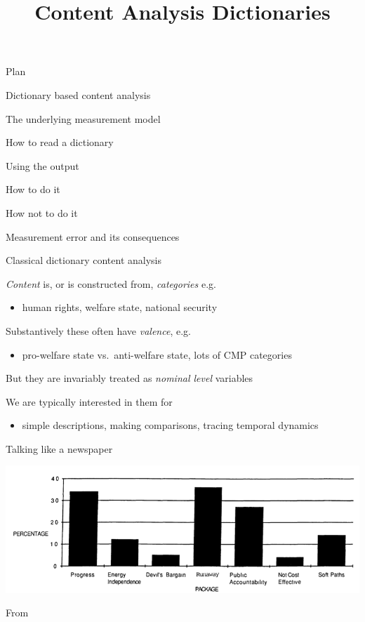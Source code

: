 \documentclass{hertieteaching}
\title{Content Analysis Dictionaries}
\begin{document}
\maketitle


\begin{frame}{Plan}
	

Dictionary based content analysis

The underlying measurement model

How to read a dictionary

Using the output

How to do it

How not to do it

Measurement error and its consequences
	
\end{frame}



\begin{frame}{Classical dictionary content analysis}

\emph{Content} is, or is constructed from, \emph{categories} e.g.

\begin{itemize}
\item
  human rights, welfare state, national security
\end{itemize}

Substantively these often have \emph{valence}, e.g.

\begin{itemize}
\item
  pro-welfare state vs.~anti-welfare state, lots of CMP categories
\end{itemize}

But they are invariably treated as \emph{nominal level} variables

We are typically interested in them for

\begin{itemize}
\item
  simple descriptions, making comparisons, tracing temporal dynamics
\end{itemize}

\end{frame}

\begin{frame}{Talking like a newspaper}

{\centering \includegraphics[width=0.9\linewidth]{pictures/gamson-modigliani-frames-opinion} 
}

\centerline{From \textcite{Gamson.Modigliani1989}}

\end{frame}
\end{document}
